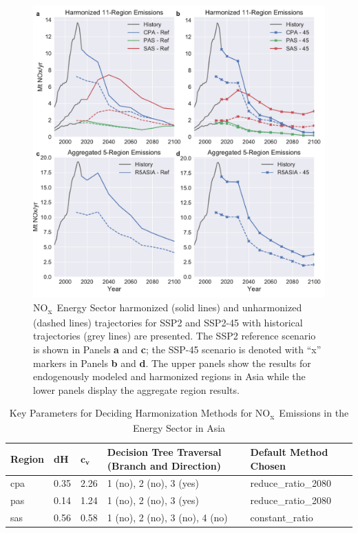 \documentclass[review]{elsarticle}
\newcommand{\noxx}{NO\textsubscript{x}~}
\begin{document}
\begin{figure}
  \begin{center}
    \includegraphics[width=\textwidth]{example_NOx_Energy_Sector.pdf}
    \caption[]{
      \label{fig:nox}
      \noxx Energy Sector harmonized (solid lines) and unharmonized (dashed lines)
      trajectories for SSP2 and SSP2-45 with historical trajectories (grey
      lines) are presented. The SSP2 reference scenario is shown in Panels
      \textbf{a} and \textbf{c}; the SSP-45 scenario is denoted with ``x''
      markers in Panels \textbf{b} and \textbf{d}. The upper panels show the
      results for endogenously modeled and harmonized regions in Asia while the
      lower panels display the aggregate region results.  
    }
  \end{center}
\end{figure}

\begin{table}[]
\centering
\caption{Key Parameters for Deciding Harmonization Methods for \noxx Emissions in the Energy Sector in Asia}
\label{tab:nox}
\begin{tabular}{|p{1.2cm}|p{.5cm}|p{.5cm}|p{4.5cm}|p{3cm}|}
\hline
\textbf{Region} & \textbf{dH} & $\mathbf{c_v}$ & \textbf{Decision Tree Traversal (Branch and Direction)} & \textbf{Default Method Chosen} \\ \hline
    \hline
\gls{cpa}             & 0.35        & 2.26          & 1 (no), 2 (no), 3 (yes)                                 & reduce\_ratio\_2080    \\ \hline
\gls{pas}             & 0.14        & 1.24          & 1 (no), 2 (no), 3 (yes)                                 & reduce\_ratio\_2080    \\ \hline
\gls{sas}             & 0.56        & 0.58          & 1 (no), 2 (no), 3 (no), 4 (no)                          & constant\_ratio        \\ \hline
\end{tabular}
\end{table}
\end{document}

